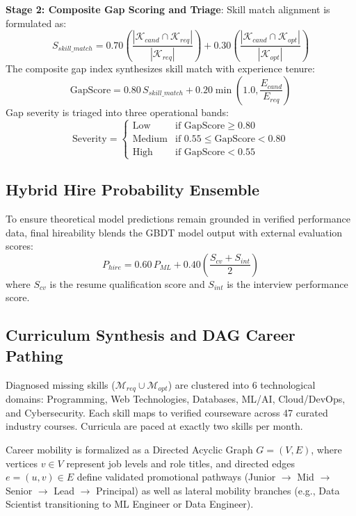 \documentclass[conference]{IEEEtran}
\begin{document}
\textbf{Stage 2: Composite Gap Scoring and Triage}: Skill match alignment is formulated as:
\begin{equation}
S_{skill\_match} = 0.70 \left(\frac{|\mathcal{K}_{cand} \cap \mathcal{K}_{req}|}{|\mathcal{K}_{req}|}\right) + 0.30 \left(\frac{|\mathcal{K}_{cand} \cap \mathcal{K}_{opt}|}{|\mathcal{K}_{opt}|}\right)
\end{equation}
The composite gap index synthesizes skill match with experience tenure:
\begin{equation}
\text{GapScore} = 0.80\,S_{skill\_match} + 0.20 \min\left(1.0, \frac{E_{cand}}{E_{req}}\right)
\end{equation}
Gap severity is triaged into three operational bands:
\begin{equation}
\text{Severity} = \begin{cases}
\text{Low} & \text{if } \text{GapScore} \ge 0.80 \\
\text{Medium} & \text{if } 0.55 \le \text{GapScore} < 0.80 \\
\text{High} & \text{if } \text{GapScore} < 0.55
\end{cases}
\end{equation}

\subsection{Hybrid Hire Probability Ensemble}
To ensure theoretical model predictions remain grounded in verified performance data, final hireability blends the GBDT model output with external evaluation scores:
\begin{equation}
P_{hire} = 0.60\,P_{ML} + 0.40 \left(\frac{S_{cv} + S_{int}}{2}\right)
\end{equation}
where $S_{cv}$ is the resume qualification score and $S_{int}$ is the interview performance score.

\subsection{Curriculum Synthesis and DAG Career Pathing}
Diagnosed missing skills ($\mathcal{M}_{req} \cup \mathcal{M}_{opt}$) are clustered into 6 technological domains: Programming, Web Technologies, Databases, ML/AI, Cloud/DevOps, and Cybersecurity. Each skill maps to verified courseware across 47 curated industry courses. Curricula are paced at exactly two skills per month.

Career mobility is formalized as a Directed Acyclic Graph $G = (V, E)$, where vertices $v \in V$ represent job levels and role titles, and directed edges $e = (u, v) \in E$ define validated promotional pathways (Junior $\to$ Mid $\to$ Senior $\to$ Lead $\to$ Principal) as well as lateral mobility branches (e.g., Data Scientist transitioning to ML Engineer or Data Engineer).
\end{document}
